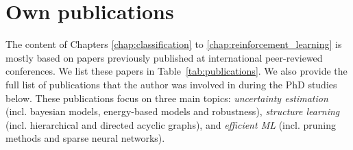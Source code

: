 \section{Own publications}

The content of Chapters \ref{chap:classification} to \ref{chap:reinforcement_learning} is mostly based on papers previously published at international peer-reviewed conferences. We list these papers in Table~\ref{tab:publications}.
We also provide the full list of publications that the author was involved in during the PhD studies below. These publications focus on three main topics: \emph{uncertainty estimation} (incl. bayesian models, energy-based models and robustness), \emph{structure learning} (incl. hierarchical and directed acyclic graphs), and \emph{efficient ML} (incl. pruning methods and sparse neural networks).

\renewcommand{\bibsection}{}
